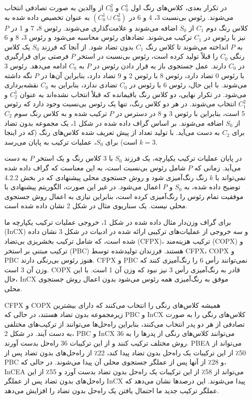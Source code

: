 \documentclass[a4paper,10pt]{article}
\begin{document}
                در تکرار بعدی، کلاس‌های رنگ اول $C_0^1$ و $C_0^2$ از والدین به صورت تصادفی انتخاب می‌شوند. رئوس بی‌نسبت 3، 4 و 6 در $(C_0^1 \cup C_0^2)$ به عنوان تخصیص داده شده به کلاس رنگ دوم $C_1$ از $S_0$ اضافه می‌شوند و علامت‌گذاری می‌شوند. رئوس 8، 7 و 1 در $P$ نیز با رئوس در $C_1$ ترکیب می‌شوند. تضادهای رئوس محاسبه می‌شود و رئوس 3، 8 و 6 به $P$ انداخته می‌شوند تا کلاس رنگ $C_1$ بدون تضاد شود. از آنجا که فرزند $S_0$ یک کلاس رنگی $C_0$ را قبلاً تولید کرده است، رئوس بی‌نسبت در استخر $P$ فرصتی برای قرارگیری در $C_0$ دارند. عمل جستجوی باز به قرار دادن رئوس در $P$ به $C_0$ ادامه می‌دهد. رئوس 3 با رئوس 0 تضاد دارد، رئوس 8 با رئوس 2 و 9 تضاد دارد، بنابراین آن‌ها در $P$ نگه داشته می‌شوند. با این حال، رئوس 6 با رئوس در $C_0$ تضادی ندارد، بنابراین به $C_0$ نقشه‌برداری می‌شود. در تکرار نهایی، دو کلاس رنگ باقیمانده که قبلاً انتخاب نشده‌اند به عنوان $C_2^1$ و $C_1^2$ انتخاب می‌شوند. در هر دو کلاس رنگ، تنها یک رئوس بی‌نسبت وجود دارد که رئوس 5 است، بنابراین با رئوس 3 و 8 در دسترس در $P$ ترکیب شده و به کلاس رنگ سوم $C_2$ از $S_0$ اضافه می‌شوند. بر اساس گراف داده شده در شکل 1، یک مجموعه بدون تضاد برای $C_2$ به دست می‌آید. با تولید تعداد از پیش تعریف شده کلاس‌های رنگ (که در اینجا $k = 3$ است) برای $S_0$، عملیات ترکیب به پایان می‌رسد.

                در پایان عملیات ترکیب یکپارچه، یک فرزند $S_0$ با 3 کلاس رنگ و یک استخر $P$ به دست می‌آید. زمانی که $P$ شامل رئوس بی‌نسبت است، به این معناست که گراف داده شده نمی‌تواند با $k$ رنگ رنگ‌آمیزی شود و روش جستجوی محلی پیشنهادی که در بخش 4.2.2 توضیح داده شده، به $S_0$ و $P$ اعمال می‌شود. در غیر این صورت، الگوریتم پیشنهادی با موفقیت تمام رئوس را رنگ‌آمیزی کرده است، بنابراین نیازی به اعمال روش جستجوی محلی نیست. یک سناریوی مثال در شکل 2 نشان داده شده است.

                برای گراف وزن‌دار مثال داده شده در شکل 1، خروجی عملیات ترکیب یکپارچه ما (InCX) و سه خروجی از عملیات‌های ترکیبی ارائه شده در ادبیات در شکل 3 نشان داده شده است، که شامل ترکیب بخشریزی بی‌تضاد (CFPX)، ترکیب هزینه‌مند (COPX) و ترکیب مبتنی بر استخر (PBC) هستند. فرزندان تولیدشده توسط CFPX، COPX و PBC هنوز رئوس بی‌رنگی دارند. CFPX و PBC نمی‌توانند رأس 6 را رنگ‌آمیزی کنند که وزن آن 3 است. COPX قادر به رنگ‌آمیزی رأس 3 نیز نبود که وزن آن 1 است. با این حال، InCX موفق به رنگ‌آمیزی همه رئوس می‌شود بدون اعمال روش جستجوی محلی.

                CFPX و COPX همیشه کلاس‌های رنگی را انتخاب می‌کنند که دارای بیشترین زیرمجموعه بدون تضاد هستند، در حالی که PBC و InCX کلاس‌های رنگی را به صورت تصادفی از هر دو پدر انتخاب می‌کنند، بنابراین راه‌حل‌ها می‌توانند از ترکیب‌های مختلفی به دست آیند. در شکل 2، PBC و InCX می‌توانند کلاس‌های رنگی از پدرها را به 36 روش مختلف ترکیب کنند و از این ترکیبات 36 راه‌حل بدست آورند. PBEA می‌تواند از 50٪ از این ترکیبات یک راه‌حل بدون تضاد پیدا کند، 22٪ از راه‌حل‌های بدون تضاد پس از PBC و 28٪ از آنها پس از عملگر جستجوی محلی آن پیدا می‌شوند. در حالی که، InCEA می‌تواند از 58٪ از این ترکیبات یک راه‌حل بدون تضاد بدست آورد و 55٪ از این راه‌حل‌های بدون تضاد پس از عملگر InCX پیدا می‌شوند. این درصدها نشان می‌دهد که عملگر ترکیب جدید ما احتمال یافتن یک راه‌حل بدون تضاد را افزایش می‌دهد.
\end{document}
